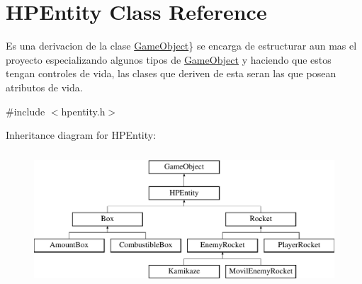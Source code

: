 \hypertarget{class_h_p_entity}{\section{H\-P\-Entity Class Reference}
\label{class_h_p_entity}
}


Es una derivacion de la clase \hyperlink{class_game_object}{Game\-Object}\} se encarga de estructurar aun mas el proyecto especializando algunos tipos de \hyperlink{class_game_object}{Game\-Object} y haciendo que estos tengan controles de vida, las clases que deriven de esta seran las que posean atributos de vida.  




{\ttfamily \#include $<$hpentity.\-h$>$}

Inheritance diagram for H\-P\-Entity\-:\begin{figure}[H]
\begin{center}
\leavevmode
\includegraphics[height=5.000000cm]{class_h_p_entity}
\end{center}
\end{figure}
